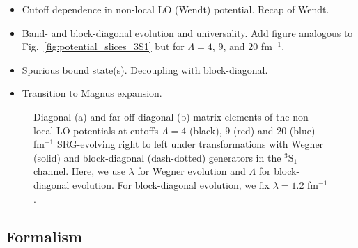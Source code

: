\documentclass[preprintnumbers,floatfix,aps,prc,preprint,nofootinbib]{revtex4-1}
\begin{document}
\begin{itemize}
	\item Cutoff dependence in non-local LO (Wendt) potential. Recap of Wendt.
	\item Band- and block-diagonal evolution and universality. Add figure analogous to Fig.~\ref{fig:potential_slices_3S1} but for $\Lambda=4$, $9$, and $20$ fm$^{-1}$.
	\item Spurious bound state(s). Decoupling with block-diagonal.
	\item Transition to Magnus expansion.
\end{itemize}
%
\begin{figure}[H]
	\centering
	
	\caption{Diagonal (a) and far off-diagonal (b) matrix elements of the non-local LO potentials at cutoffs $\Lambda=4$ (black), $9$ (red) and $20$ (blue) fm$^{-1}$ SRG-evolving right to left under transformations with Wegner (solid) and block-diagonal (dash-dotted) generators in the $^3$S$_1$ channel. Here, we use $\lambda$ for Wegner evolution and $\Lambda$ for block-diagonal evolution. For block-diagonal evolution, we fix $\lambda=1.2$ fm$^{-1}$.}
	\label{fig:potential_slices_high_cutoffs}
\end{figure}
%


\subsection{Formalism}
\label{sec:magnus_expansion_formalism}
\end{document}
